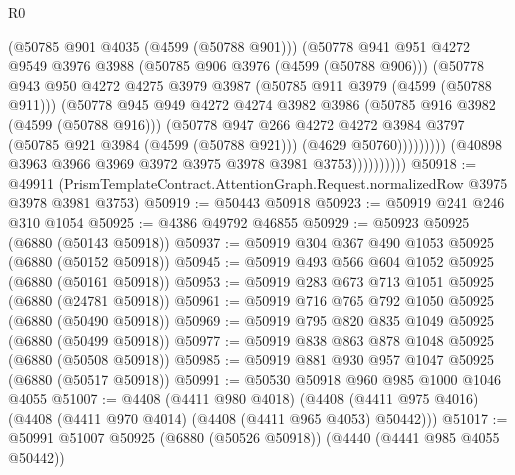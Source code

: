 \begin{lexlean}{R0}
\begin{coremodule}
                              (@50785 @901 @4035 (@4599 (@50788 @901)))
                              (@50778
                                @941
                                @951
                                @4272
                                @9549
                                @3976
                                @3988
                                (@50785 @906 @3976 (@4599 (@50788 @906)))
                                (@50778
                                  @943
                                  @950
                                  @4272
                                  @4275
                                  @3979
                                  @3987
                                  (@50785 @911 @3979 (@4599 (@50788 @911)))
                                  (@50778
                                    @945
                                    @949
                                    @4272
                                    @4274
                                    @3982
                                    @3986
                                    (@50785 @916 @3982 (@4599 (@50788 @916)))
                                    (@50778
                                      @947
                                      @266
                                      @4272
                                      @4272
                                      @3984
                                      @3797
                                      (@50785 @921 @3984 (@4599 (@50788 @921)))
                                      (@4629 @50760)))))))))
                      (@40898 @3963 @3966 @3969 @3972 @3975 @3978 @3981 @3753))))))))))
@50918 := @49911
    (PrismTemplateContract.AttentionGraph.Request.normalizedRow @3975 @3978 @3981 @3753)
@50919 := @50443 @50918
@50923 := @50919 @241 @246 @310 @1054
@50925 := @4386 @49792 @46855
@50929 := @50923 @50925 (@6880 (@50143 @50918))
@50937 := @50919 @304 @367 @490 @1053 @50925 (@6880 (@50152 @50918))
@50945 := @50919 @493 @566 @604 @1052 @50925 (@6880 (@50161 @50918))
@50953 := @50919 @283 @673 @713 @1051 @50925 (@6880 (@24781 @50918))
@50961 := @50919 @716 @765 @792 @1050 @50925 (@6880 (@50490 @50918))
@50969 := @50919 @795 @820 @835 @1049 @50925 (@6880 (@50499 @50918))
@50977 := @50919 @838 @863 @878 @1048 @50925 (@6880 (@50508 @50918))
@50985 := @50919 @881 @930 @957 @1047 @50925 (@6880 (@50517 @50918))
@50991 := @50530 @50918 @960 @985 @1000 @1046 @4055
@51007 := @4408
    (@4411 @980 @4018)
    (@4408 (@4411 @975 @4016) (@4408 (@4411 @970 @4014) (@4408 (@4411 @965 @4053) @50442)))
@51017 := @50991 @51007 @50925 (@6880 (@50526 @50918)) (@4440 (@4441 @985 @4055 @50442))

\end{coremodule}
\end{lexlean}
